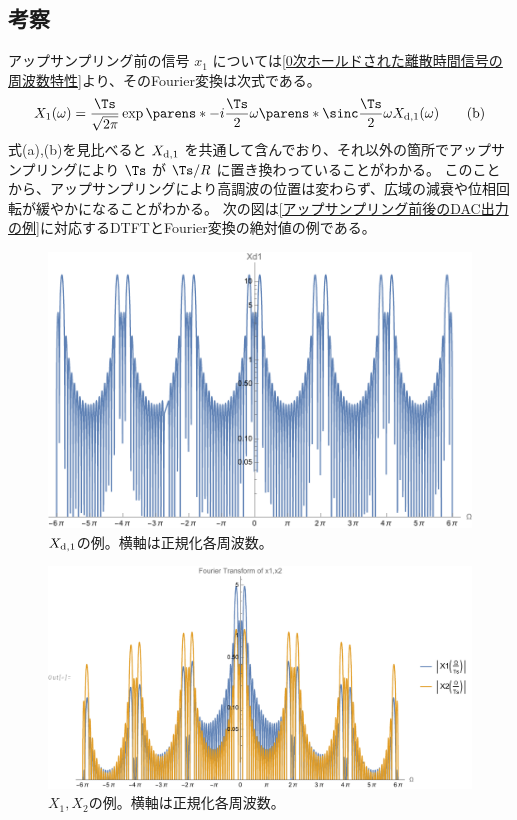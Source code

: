         \subsection{考察}
            アップサンプリング前の信号 $x_1$ については\ref{0次ホールドされた離散時間信号の周波数特性}より、そのFourier変換は次式である。
            \[ X_1(\omega) = \frac{\Ts}{\sqrt{2\pi}}\exp\parens*{-i\frac{\Ts}{2}\omega}\parens*{\sinc \frac{\Ts}{2}\omega}\Xda(\omega) \tag{b} \]
            式(a),(b)を見比べると $X_{\text{d},1}$ を共通して含んでおり、それ以外の箇所でアップサンプリングにより $\Ts$ が $\Ts/R$ に置き換わっていることがわかる。
            このことから、アップサンプリングにより高調波の位置は変わらず、広域の減衰や位相回転が緩やかになることがわかる。
            次の図は\ref{アップサンプリング前後のDAC出力の例}に対応するDTFTとFourier変換の絶対値の例である。
            \begin{figure}[H]
                \centering
                \includegraphics[keepaspectratio, scale=0.8]
                {parts/time-discretization/chapters/up-sampling/imgs/Xd1.pdf}
                \caption{$X_{\text{d},1}$の例。横軸は正規化各周波数。}
            \end{figure}
            \begin{figure}[H]
                \centering
                \includegraphics[keepaspectratio, scale=0.8]
                {parts/time-discretization/chapters/up-sampling/imgs/FT_of_x1,x2.pdf}
                \caption{$X_1,X_2$の例。横軸は正規化各周波数。}
            \end{figure}